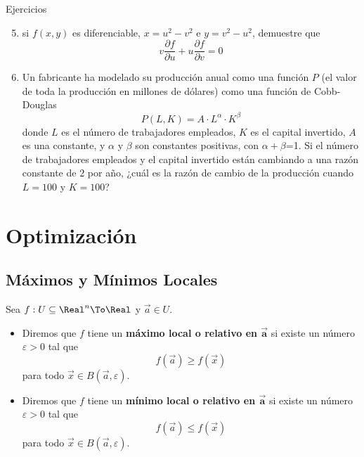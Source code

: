\begin{frame}{Ejercicios}
  \vspace{-0.5cm}
  \begin{enumerate}
    \setcounter{enumi}{4}
    \item si $f(x,y)$ es diferenciable, $x=u^2-v^2$ e $y=v^2-u^2$, demuestre que
      $$v\dfrac{\partial f}{\partial u}+u\dfrac{\partial f}{\partial v}=0$$
    \item Un fabricante ha modelado su producción anual como una función $P$ (el valor de toda la producción en millones de dólares) como una función de Cobb-Douglas
      $$P(L,K)=A\cdot L^{\alpha}\cdot K^{\beta}$$
      donde $L$ es el número de trabajadores empleados, $K$ es el capital invertido, $A$ es una constante, y $\alpha$ y $\beta$ son constantes positivas, con $\alpha+\beta$=1. Si el número de trabajadores empleados y el capital invertido están cambiando a una razón constante de $2$ por año, ¿cuál es la razón de cambio de la producción cuando $L=100$ y $K=100$?\\[0.25cm]
  \end{enumerate}
\end{frame}

\section{Optimización}
\begin{frame}
\sectionpage
\end{frame}

\begin{frame}
\tableofcontents[currentsection]
\end{frame}

\subsection{Máximos y Mínimos Locales}
\begin{frame}
\subsectionpage
\end{frame}


\begin{frame}
  \begin{defn}
    Sea $f:U\subseteq\Real^n\To\Real$ y $\vec{a}\in U$. 
    \begin{itemize}[<+->]
      \item Diremos que $f$ tiene un \textbf{máximo local o relativo en $\boldsymbol{\vec{a}}$} si existe un número $\varepsilon>0$ tal que
        $$f(\vec{a})\geq f(\vec{x})$$
        para todo $\vec{x}\in B(\vec{a},\varepsilon)$.\\[0.25cm]
      \item Diremos que $f$ tiene un \textbf{mínimo local o relativo en $\boldsymbol{\vec{a}}$} si existe un número $\varepsilon>0$ tal que 
        $$f(\vec{a})\leq f(\vec{x})$$
        para todo $\vec{x}\in B(\vec{a},\varepsilon)$.
    \end{itemize}
  \end{defn}
\end{frame}

